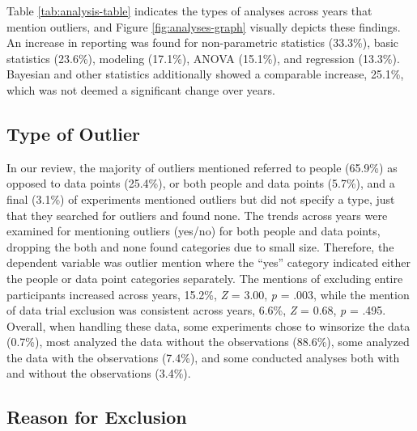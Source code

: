 \documentclass[english,,man]{apa6}
\begin{document}
Table \ref{tab:analysis-table} indicates the types of analyses across years that mention outliers, and Figure \ref{fig:analyses-graph} visually depicts these findings. An increase in reporting was found for non-parametric statistics (33.3\%), basic statistics (23.6\%), modeling (17.1\%), ANOVA (15.1\%), and regression (13.3\%). Bayesian and other statistics additionally showed a comparable increase, 25.1\%, which was not deemed a significant change over years.

\hypertarget{type-of-outlier}{%
\subsection{Type of Outlier}\label{type-of-outlier}}

In our review, the majority of outliers mentioned referred to people (65.9\%) as opposed to data points (25.4\%), or both people and data points (5.7\%), and a final (3.1\%) of experiments mentioned outliers but did not specify a type, just that they searched for outliers and found none. The trends across years were examined for mentioning outliers (yes/no) for both people and data points, dropping the both and none found categories due to small size. Therefore, the dependent variable was outlier mention where the \enquote{yes} category indicated either the people or data point categories separately. The mentions of excluding entire participants increased across years, 15.2\%, \emph{Z} = 3.00, \emph{p} = .003, while the mention of data trial exclusion was consistent across years, 6.6\%, \emph{Z} = 0.68, \emph{p} = .495. Overall, when handling these data, some experiments chose to winsorize the data (0.7\%), most analyzed the data without the observations (88.6\%), some analyzed the data with the observations (7.4\%), and some conducted analyses both with and without the observations (3.4\%).

\hypertarget{reason-for-exclusion}{%
\subsection{Reason for Exclusion}\label{reason-for-exclusion}}
\end{document}
